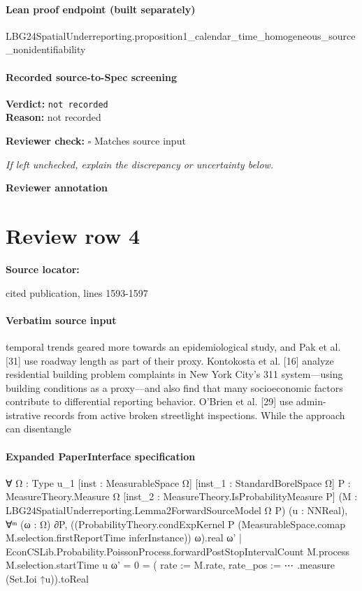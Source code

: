 \documentclass[10pt]{article}
\newcommand{\reviewerbox}{%
  \par\noindent\fbox{\parbox{0.96\linewidth}{\rule{0pt}{0.38in}}}\par
}
\newcommand{\reviewmatch}[1]{%
  \par\noindent\textbf{Reviewer check:} $\square$\; #1\par
  \noindent\emph{If left unchecked, explain the discrepancy or uncertainty below.}\par
}
\begin{document}
\paragraph{Lean proof endpoint (built separately)}\begin{ReviewVerbatim}
LBG24SpatialUnderreporting.proposition1_calendar_time_homogeneous_source_nonidentifiability
\end{ReviewVerbatim}

\paragraph{Recorded source-to-Spec screening}
\textbf{Verdict:} \texttt{not recorded}
\\
\textbf{Reason:} not recorded
\reviewmatch{Matches source input}
\noindent\textbf{Reviewer annotation}\par
\reviewerbox
\clearpage
\hypertarget{source-claim-2dea6ca4e4c14b1e}{}
\section*{Review row 4}
\textbf{Source locator:} {\footnotesize\raggedright cited publication, lines 1593-\allowbreak{}1597\par}
\paragraph{Verbatim source input}
\begin{ReviewVerbatim}
temporal trends geared more towards an epidemiological study, and Pak et al. [31] use roadway
length as part of their proxy. Kontokosta et al. [16] analyze residential building problem complaints
in New York City’s 311 system—using building conditions as a proxy—and also find that many
socioeconomic factors contribute to differential reporting behavior. O’Brien et al. [29] use admin-
istrative records from active broken streetlight inspections. While the approach can disentangle
\end{ReviewVerbatim}


\paragraph{Expanded PaperInterface specification}
\begin{ReviewVerbatim}
∀ {Ω : Type u_1} [inst : MeasurableSpace Ω] [inst_1 : StandardBorelSpace Ω] {P : MeasureTheory.Measure Ω}
  [inst_2 : MeasureTheory.IsProbabilityMeasure P] (M : LBG24SpatialUnderreporting.Lemma2ForwardSourceModel Ω P)
  (u : NNReal),
  ∀ᵐ (ω : Ω) ∂P,
    ((ProbabilityTheory.condExpKernel P (MeasurableSpace.comap M.selection.firstReportTime inferInstance)) ω).real
        {ω' |
          EconCSLib.Probability.PoissonProcess.forwardPostStopIntervalCount M.process M.selection.startTime u ω' = 0} =
      ({ rate := M.rate, rate_pos := ⋯ }.measure (Set.Ioi ↑u)).toReal
\end{ReviewVerbatim}
\end{document}
